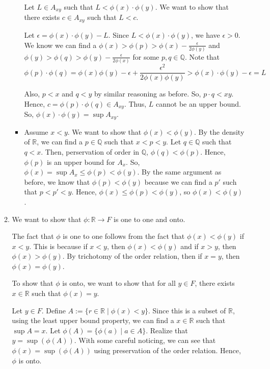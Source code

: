 \documentclass[12pt]{article}
\begin{document}
\begin{enumerate}[start=1,label={\bfseries Problem \arabic*:},leftmargin=1in]
\begin{enumerate}
\begin{itemize}
            Let $L \in A_{xy}$ such that $L < \phi(x) \cdot \phi(y)$. We want to show that there exists $c \in A_{xy}$ such that $L < c$.
        
            Let $\epsilon = \phi(x) \cdot \phi(y) - L$. Since $L < \phi(x) \cdot \phi(y)$, we have $\epsilon > 0$.
             We know we can find a $\phi(x) > \phi(p) > \phi(x) - \frac{\epsilon}{2\phi(y)}$ and $\phi(y) > \phi(q) > \phi(y) - \frac{\epsilon}{2\phi(x)}$ for some $p, q \in \mathbb{Q}$.
            Note that \[
                \phi(p) \cdot \phi(q) = \phi (x) \phi(y) - \epsilon + \frac{\epsilon^{2}}{2\phi(x)\phi(y)} > \phi(x) \cdot \phi(y) - \epsilon = L
            \]
            
            Also, $p < x$ and $q < y$ by similar reasoning as before. So, $p \cdot q < xy$. Hence, $c = \phi(p) \cdot \phi(q) \in A_{xy}$.
            Thus, $L$ cannot be an upper bound. So, $\phi(x) \cdot \phi(y) = \sup A_{xy}$.
            
            \item Assume $x < y$. We want to show that $\phi(x) < \phi(y)$. 
            By the density of $\mathbb{R}$, we can find a $p \in \mathbb{Q}$ such that $x < p < y$.
            Let $q \in \mathbb{Q}$ such that $q < x$. Then, perservation of order in $\mathbb{Q}$,    
            $\phi(q) < \phi(p)$. Hence, $\phi(p)$ is an upper bound for $A_{x}$. So, $\phi(x) = \sup A_{x} \leq \phi(p) < \phi(y)$. 
            By the same argument as before, we know that $\phi(p) < \phi(y)$ because we can find a $p'$ such that $p < p' < y$. Hence, $\phi(x) \leq \phi(p) < \phi(y)$, so $\phi(x) < \phi(y)$.

        \end{itemize}

        \item We want to show that $\phi: \mathbb{R} \rightarrow F$ is one to one and onto. 
        
        The fact that $\phi$ is one to one follows from the fact that $\phi(x) < \phi(y)$ if $x < y$. 
        This is because if $x < y$, then $\phi(x) < \phi(y)$ and if $x > y$, then $\phi(x) > \phi(y)$. By trichotomy of the order relation, then if $x = y$, then $\phi(x) = \phi(y)$.

        To show that $\phi$ is onto, we want to show that for all $y \in F$, there exists $x \in \mathbb{R}$ such that $\phi(x) = y$.  

        Let $y \in F$. Define $A := \{ r \in \mathbb{R} \mid \phi(x) < y \}$. 
        Since this is a subset of $\mathbb{R}$, using the least upper bound property, we can find a $x \in \mathbb{R}$ such that $\sup A = x$.
        Let $\phi(A) = \{ \phi(a) \mid a \in A\}$. Realize that $y = \sup (\phi(A))$. With some careful noticing, we can see that $\phi(x) = \sup (\phi(A))$ using preservation of the order relation. 
        Hence, $\phi$ is onto. 
    \end{enumerate}

    \end{enumerate}
\end{document}
